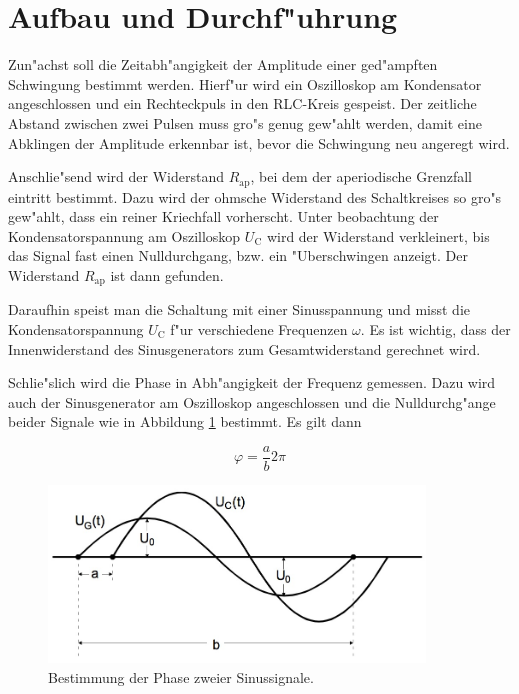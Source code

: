 \section{Aufbau und Durchf"uhrung}
	\label{sec:durchfuehrung}

	Zun"achst soll die Zeitabh"angigkeit der Amplitude einer ged"ampften Schwingung bestimmt werden.
	Hierf"ur wird ein Oszilloskop am Kondensator angeschlossen und ein Rechteckpuls in den RLC-Kreis gespeist.
	Der zeitliche Abstand zwischen zwei Pulsen muss gro"s genug gew"ahlt werden, damit eine Abklingen der Amplitude erkennbar ist, bevor die Schwingung neu angeregt wird.

	Anschlie"send wird der Widerstand $R_\mathrm{ap}$, bei dem der aperiodische Grenzfall eintritt bestimmt.
	Dazu wird der ohmsche Widerstand des Schaltkreises so gro"s gew"ahlt, dass ein reiner Kriechfall vorherscht.
	Unter beobachtung der Kondensatorspannung am Oszilloskop $U_\mathrm{C}$ wird der Widerstand verkleinert, bis das Signal fast einen Nulldurchgang, bzw. ein "Uberschwingen anzeigt.
	Der Widerstand $R_\mathrm{ap}$ ist dann gefunden.

	Daraufhin speist man die Schaltung mit einer Sinusspannung und misst die Kondensatorspannung $U_\mathrm{C}$ f"ur verschiedene Frequenzen $\omega$.
	Es ist wichtig, dass der Innenwiderstand des Sinusgenerators zum Gesamtwiderstand gerechnet wird.

	Schlie"slich wird die Phase in Abh"angigkeit der Frequenz gemessen.
	Dazu wird auch der Sinusgenerator am Oszilloskop angeschlossen und die Nulldurchg"ange beider Signale wie in Abbildung \ref{fig:phase} bestimmt.
	Es gilt dann

	\begin{equation*}
		\varphi = \frac{a}{b} 2 \pi
	\end{equation*}

	\begin{figure}[h!]
		\centering
		\includegraphics[width = 10cm]{img/phase.JPG}
		\caption{Bestimmung der Phase zweier Sinussignale. \cite{anleitung}}
		\label{fig:phase}
	\end{figure}